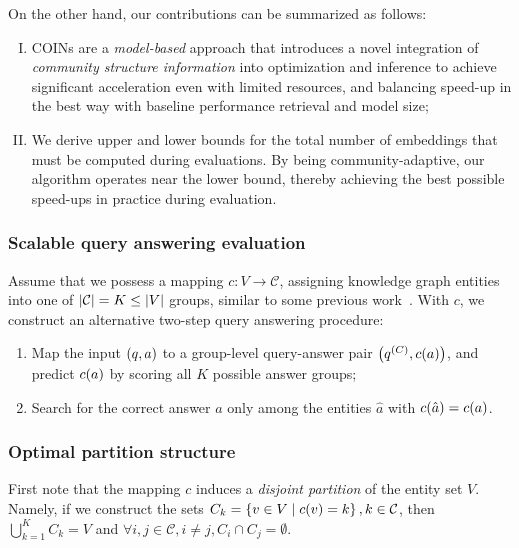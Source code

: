 On the other hand, our contributions can be summarized as follows:
\begin{enumerate}[I.]
    \item COINs are a \emph{model-based} approach that introduces a novel integration of \emph{community structure information} into optimization and inference to achieve significant acceleration even with limited resources, and balancing speed-up in the best way with baseline performance retrieval and model size;
    \item We derive upper and lower bounds for the total number of embeddings that must be computed during evaluations. By being community-adaptive, our algorithm operates near the lower bound, thereby achieving the best possible speed-ups in practice during evaluation. 
\end{enumerate}
\subsubsection{Scalable query answering evaluation}
Assume that we possess a mapping $c: V \to \mathcal{C}$, assigning knowledge graph entities into one of $\mathopen{}\left|\mathcal{C}\right| = K \leq \mathopen{}\left|V\right|$  groups, similar to some previous work~\cite{lerer_pytorch-biggraph_2019,zheng_dgl-ke_2020}. 
With $c$, we construct an alternative two-step query answering procedure:
 \begin{enumerate}
     \item Map the input $\mathopen{}\left(q, a\right)$ to a group-level query-answer pair $\mathopen{}\left(q^{\mathopen{}\left(C\right)}, c\mathopen{}\left(a\right)\right)$, and predict $c\mathopen{}\left(a\right)$ by scoring all $K$ possible answer groups;
     \item Search for the correct answer $a$ only among the entities $\hat{a}$ with $c\mathopen{}\left(\hat{a}\right)=c\mathopen{}\left(a\right)$.
 \end{enumerate}

\subsubsection{Optimal partition structure}

First note that the mapping $c$ induces a \emph{disjoint partition} of the entity set $V$. Namely, if we construct the sets $C_k = \mathopen{}\left\{v \in V \mid c\mathopen{}\left(v\right)=k\right\}, k \in \mathcal{C}$, then $\bigcup_{k=1}^{K}{C_k}=V$ and $\forall i,j \in \mathcal{C},i \neq j, C_i \cap C_j = \emptyset$. 

